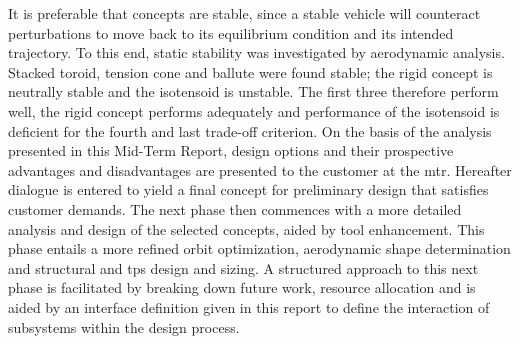 \newline
It is preferable that concepts are stable, since a stable vehicle will counteract perturbations to move back to its equilibrium condition and its intended trajectory. To this end, static stability was investigated by aerodynamic analysis. Stacked toroid, tension cone and ballute were found stable; the rigid concept is neutrally stable and the isotensoid is unstable. The first three therefore perform well, the rigid concept performs adequately and performance of the isotensoid is deficient for the fourth and last trade-off criterion.
\newline
\newline
On the basis of the analysis presented in this Mid-Term Report, design options and their prospective advantages and disadvantages are presented to the customer at the \gls{mtr}. Hereafter dialogue is entered to yield a final concept for preliminary design that satisfies customer demands. The next phase then commences with a more detailed analysis and design of the selected concepts, aided by tool enhancement. This phase entails a more refined orbit optimization, aerodynamic shape determination and structural and \gls{tps} design and sizing. A structured approach to this next phase is facilitated by breaking down future work, resource allocation and is aided by an interface definition given in this report to define the interaction of subsystems within the design process.
